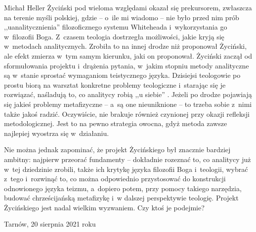 \begin{artplenv}{Michał Heller}
Życiński pod wieloma względami okazał się prekursorem, zwłaszcza na terenie myśli polskiej, gdzie -- o~ile mi wiadomo -- nie było przed nim prób ,,uanalitycznienia'' filozoficznego systemu Whiteheada i~wykorzystania go w~filozofii Boga. Z~czasem teologia dostrzegła możliwości, jakie kryją się w~metodach analitycznych. Zrobiła to na innej drodze niż proponował Życiński, ale efekt zmierza w~tym samym kierunku, jaki on proponował. Życiński zaczął od sformułowania projektu i~drążenia pytania, w~jakim stopniu metody analityczne są w~stanie sprostać wymaganiom teistycznego języka. Dzisiejsi teologowie po prostu biorą na warsztat konkretne problemy teologiczne i~starając się je rozwiązać, naśladują to, co analitycy robią ,,u siebie''
\parencites[por. np.][]{crisp_analytic_2009}[pojawiła się także polska ,,jaskółka'':][]{holda_kochac_2021}. %
 Jeżeli po drodze pojawiają się jakieś problemy metafizyczne -- a~są one nieuniknione -- to trzeba sobie z~nimi także jakoś radzić. Oczywiście, nie brakuje również czynionej przy okazji refleksji metodologicznej. Jest to na pewno strategia owocna, gdyż metoda zawsze najlepiej wyostrza się w~działaniu.

Nie można jednak zapominać, że projekt Życińskiego był znacznie bardziej ambitny: najpierw przeorać fundamenty -- dokładnie rozeznać to, co analitycy już w~tej dziedzinie zrobili, także ich krytykę języka filozofii Boga i~teologii, wybrać z~tego i~rozwinąć to, co można odpowiednio przystosować do konstrukcji odnowionego języka teizmu, a~dopiero potem, przy pomocy takiego narzędzia, budować chrześcijańską metafizykę i~w dalszej perspektywie teologię. Projekt Życińskiego jest nadal wielkim wyzwaniem. Czy ktoś je podejmie?


\begin{flushright}
Tarnów, 20 sierpnia 2021 roku
\end{flushright}


\end{artplenv}
